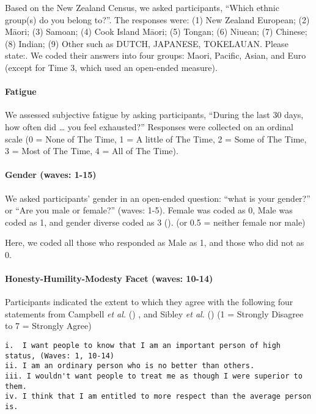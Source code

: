 \documentclass[
  single column]{article}
\let\oldparagraph\paragraph
\renewcommand{\paragraph}[1]{\oldparagraph{#1}\mbox{}}
\begin{document}
Based on the New Zealand Census, we asked participants, ``Which ethnic
group(s) do you belong to?''. The responses were: (1) New Zealand
European; (2) Māori; (3) Samoan; (4) Cook Island Māori; (5) Tongan; (6)
Niuean; (7) Chinese; (8) Indian; (9) Other such as DUTCH, JAPANESE,
TOKELAUAN. Please state:. We coded their answers into four groups:
Maori, Pacific, Asian, and Euro (except for Time 3, which used an
open-ended measure).

\paragraph{Fatigue}\label{fatigue}

We assessed subjective fatigue by asking participants, ``During the last
30 days, how often did \ldots{} you feel exhausted?'' Responses were
collected on an ordinal scale (0 = None of The Time, 1 = A little of The
Time, 2 = Some of The Time, 3 = Most of The Time, 4 = All of The Time).

\paragraph{Gender (waves: 1-15)}\label{gender-waves-1-15}

We asked participants' gender in an open-ended question: ``what is your
gender?'' or ``Are you male or female?'' (waves: 1-5). Female was coded
as 0, Male was coded as 1, and gender diverse coded as 3
(). (or 0.5
= neither female nor male)

Here, we coded all those who responded as Male as 1, and those who did
not as 0.

\paragraph{Honesty-Humility-Modesty Facet (waves:
10-14)}\label{honesty-humility-modesty-facet-waves-10-14}

Participants indicated the extent to which they agree with the following
four statements from Campbell \emph{et al.}
() , and Sibley \emph{et al.}
() (1 = Strongly Disagree to 7 = Strongly
Agree)

\begin{verbatim}
i.  I want people to know that I am an important person of high status, (Waves: 1, 10-14)
ii. I am an ordinary person who is no better than others.
iii. I wouldn't want people to treat me as though I were superior to them.
iv. I think that I am entitled to more respect than the average person is.
\end{verbatim}
\end{document}
